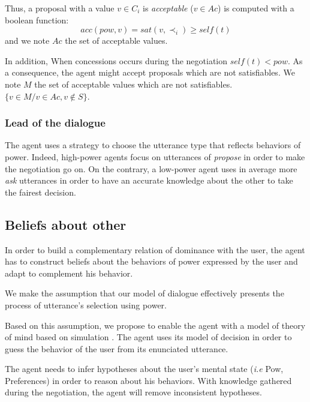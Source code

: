 \documentclass[sigconf]{aamas}  %
\begin{document}
	
	Thus, a proposal with a value $v \in C_i$ is \emph{acceptable} ($v \in Ac$) is computed with a boolean function:
	\begin{equation}
	acc(pow, v) = sat(v, \prec_i) \geq self(t)
	\end{equation}	
	and we note $Ac$ the set of acceptable values.
	
	In addition, When concessions occurs during the negotiation $self(t) < pow$. As a consequence, the agent might accept proposals which are not satisfiables. We note $M$ the set of acceptable values which are not satisfiables.
	$\{v \in M / v \in Ac, v \notin S\}$.
	
	\subsubsection{Lead of the dialogue}
	The agent uses a strategy to choose the utterance type that reflects behaviors of power. Indeed, high-power agents focus on utterances of \emph{propose} in order to make the negotiation go on. On the contrary, a low-power agent uses in average more \emph{ask} utterances in order to have an accurate knowledge about the other to take the fairest decision.
	
	\subsection{Beliefs about other}
	
	In order to build a complementary relation of dominance with the user, the agent has to construct beliefs about the behaviors of power expressed by the user and adapt to complement his behavior. 
	
	We make the assumption that our model of dialogue effectively presents the process of utterance's selection using power. 
	
	Based on this assumption, we propose to enable the agent with a model of theory of mind based on simulation \cite{bibid}. The agent uses its model of decision in order to guess the behavior of the user from its enunciated utterance.   
	
	The agent needs to infer hypotheses about the user's mental state (\emph{i.e} Pow, Preferences) in order to reason about his behaviors. With knowledge gathered during the negotiation, the agent will remove inconsistent hypotheses.
	
\end{document}

